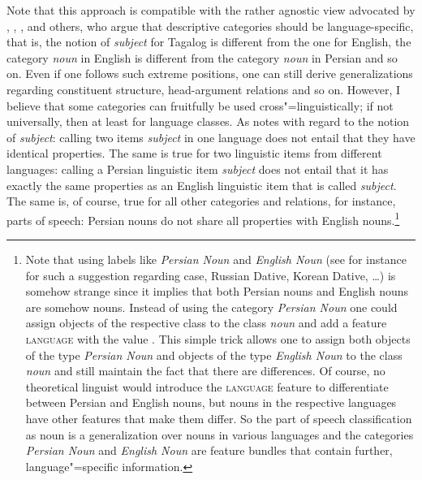 Note that this approach is compatible with the rather agnostic view advocated by
\citet{Haspelmath2010a}, \citet{Dryer97a-u}, \citet[Section~1.4.2--1.4.3]{Croft2001a}, and others, who argue that descriptive categories should be
language-specific, that is, the notion of \emph{subject} for Tagalog is different from the one for English,
the category \emph{noun} in English is different from the category \emph{noun} in Persian and so on. Even if one
follows such extreme positions, one can still derive generalizations regarding constituent structure,
head-argument relations and so on. However, I believe that some categories can fruitfully be used
cross"=linguistically; if not universally, then at least for language classes. As \citet[]{Newmeyer2010a} notes with regard to the notion of \emph{subject}: calling two items \emph{subject}
in one language does not entail that they have identical properties. The same is true for two
linguistic items from different languages: calling a Persian linguistic item \emph{subject} does not entail
that it has exactly the same properties as an English linguistic item that is called
\emph{subject}. The same is, of course, true for all other categories and relations, for instance, parts of speech:
Persian nouns do not share all properties with English nouns.\footnote{%
  Note that using labels like \emph{Persian Noun} and \emph{English Noun} (see for instance
  \citealp[Section~2]{Haspelmath2010a} for such a suggestion regarding case, \eg Russian Dative,
  Korean Dative, \ldots) is somehow strange since
  it implies that both Persian nouns and English nouns are somehow nouns. Instead of using the
  category \emph{Persian Noun} one could assign objects of the respective class to the class
  \emph{noun} and add a feature \textsc{language} with the value . This simple trick
  allows one to assign both objects of the type \emph{Persian Noun} and objects of the type
  \emph{English Noun} to the class \emph{noun} and still maintain the fact that there are
  differences. Of course, no theoretical linguist would introduce the \textsc{language} feature to
  differentiate between Persian and English nouns, but nouns in the respective languages have other features that
  make them differ. So the part of speech classification as noun is a generalization over nouns in
  various languages and the categories \emph{Persian Noun} and \emph{English Noun} are feature
  bundles that contain further, language"=specific information.

}
